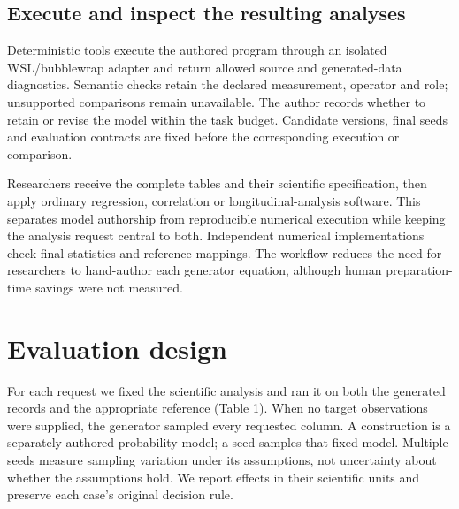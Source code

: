 \documentclass[sigconf,review]{acmart}
\begin{document}
\subsection{Execute and inspect the resulting analyses}

Deterministic tools execute the authored program through an isolated WSL/\allowbreak{}bubblewrap adapter and return allowed source and generated-data diagnostics. Semantic checks retain the declared measurement, operator and role; unsupported comparisons remain unavailable. The author records whether to retain or revise the model within the task budget. Candidate versions, final seeds and evaluation contracts are fixed before the corresponding execution or comparison.


Researchers receive the complete tables and their scientific specification, then apply ordinary regression, correlation or longitudinal-analysis software. This separates model authorship from reproducible numerical execution while keeping the analysis request central to both. Independent numerical implementations check final statistics and reference mappings. The workflow reduces the need for researchers to hand-author each generator equation, although human preparation-time savings were not measured.


\section{Evaluation design}

For each request we fixed the scientific analysis and ran it on both the generated records and the appropriate reference (Table 1). When no target observations were supplied, the generator sampled every requested column. A construction is a separately authored probability model; a seed samples that fixed model. Multiple seeds measure sampling variation under its assumptions, not uncertainty about whether the assumptions hold. We report effects in their scientific units and preserve each case's original decision rule.
\end{document}

